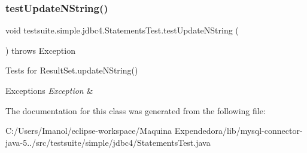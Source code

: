 \subsubsection{\texorpdfstring{test\+Update\+N\+String()}{testUpdateNString()}}
{\footnotesize\ttfamily void testsuite.\+simple.\+jdbc4.\+Statements\+Test.\+test\+Update\+N\+String (\begin{DoxyParamCaption}{ }\end{DoxyParamCaption}) throws Exception}

Tests for Result\+Set.\+update\+N\+String()


\begin{DoxyExceptions}{Exceptions}
{\em Exception} & \\
\hline
\end{DoxyExceptions}


The documentation for this class was generated from the following file\+:\begin{DoxyCompactItemize}
\item 
C\+:/\+Users/\+Imanol/eclipse-\/workspace/\+Maquina Expendedora/lib/mysql-\/connector-\/java-\/5../src/testsuite/simple/jdbc4/Statements\+Test.\+java\end{DoxyCompactItemize}

